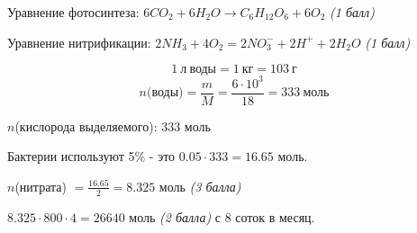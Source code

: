 \solutionSection 

Уравнение фотосинтеза: $6CO_2 + 6H_2O \to C_6H_{12}O_6+6O_2$ \textit{(1 балл)}

Уравнение нитрификации: $2NH_3 + 4O_2= 2NO_3^- + 2H^+ + 2H_2O$ \textit{(1 балл)}

$$1 \: \text{л} \: \text{воды} = 1 \: \text{кг} = 103 \: \text{г}$$
$$n\text{(воды)}= \frac{m}{M}=\frac{6\cdot10^3}{18}=333 \: \text{моль}$$

$n$(кислорода выделяемого): 333 моль

Бактерии используют 5\% - это $0.05\cdot333 = 16.65$ моль.

$n$(нитрата) $= \frac{16.65}{2} = 8.325$ моль \textit{(3 балла)}

$8.325\cdot800\cdot4=26640$ моль \textit{(2 балла)} с 8 соток в месяц.